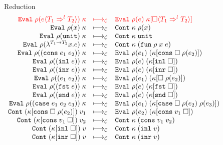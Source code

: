\documentclass[acmsmall,review,anonymous]{acmart}\settopmatter{printfolios=true,printccs=false,printacmref=false}
\newcommand{\sOOinspect}[3]{\mathtt{Eval} \; #2(#1) \; #3}
\newcommand{\sOOreturn}[2]{\mathtt{Cont} \; #2 \; #1}
\newcommand{\eOOvar}[1]{#1}
\newcommand{\eOOsole}[0]{\mathtt{unit}}
\newcommand{\eOOlam}[4]{\lambda^{#1\rightarrow{}#2}#3.#4}
\newcommand{\eOOapp}[2]{#1 \; #2}
\newcommand{\eOOcons}[2]{\mathtt{cons} \; #1 \; #2}
\newcommand{\eOOcar}[1]{\mathtt{fst} \; #1}
\newcommand{\eOOcdr}[1]{\mathtt{snd} \; #1}
\newcommand{\eOOinl}[1]{\mathtt{inl} \; #1}
\newcommand{\eOOinr}[1]{\mathtt{inr} \; #1}
\newcommand{\eOOcase}[3]{\mathtt{case} \; #1 \; #2 \; #3}
\newcommand{\eOOcast}[4]{#1 \langle \cOOcast{#2}{#3}{#4} \rangle}
\newcommand{\cOOcast}[3]{#1 \Rightarrow^{#2} #3}
\newcommand{\vOOfun}[3]{\mathtt{fun} \; #1 \; #2 \; #3}
\newcommand{\vOOtt}[0]{\mathtt{unit}}
\newcommand{\vOOcons}[2]{\mathtt{cons}\;#1\;#2}
\newcommand{\vOOinl}[1]{\mathtt{inl}\;#1}
\newcommand{\vOOinr}[1]{\mathtt{inr}\;#1}
\newcommand{\kOOconsI}[3]{#3[\mathtt{cons} \; \square \; #2(#1) ]}
\newcommand{\kOOconsII}[2]{#2[\mathtt{cons} \; #1 \; \square]}
\newcommand{\kOOinl}[1]{#1[\mathtt{inl} \; \square]}
\newcommand{\kOOinr}[1]{#1[\mathtt{inr} \; \square]}
\newcommand{\kOOappI}[3]{
	#3[\square \; #2(#1) ]
}
\newcommand{\kOOcar}[1]{#1[\mathtt{fst} \; \square]}
\newcommand{\kOOcdr}[1]{#1[\mathtt{snd} \; \square]}
\newcommand{\kOOcaseI}[4]{
	#4[\mathtt{case} \; \square \; #3(#1) \; #3(#2) ]}
\newcommand{\kOOcast}[2]{
	#2[\square \langle #1 \rangle]}
\newcommand{\judgeCreduce}[2]{#1 \longmapsto_{\mathcal{C}} #2}
\newcommand{\redrule}[3]{#1 & \longmapsto_\mathcal{C} & #2 & #3\\}
\newcommand{\hiredrule}[3]{\highlight{#1} & \highlight{\longmapsto_\mathcal{C}} & \highlight{#2} & \highlight{#3} \\}
\newcommand{\highlight}[1]{{\color{red} #1}}
\begin{document}
\begin{figure}
	
	\[
	\begin{array}{rclr}
	\end{array}
	\]
	
	Reduction \fbox{$ \judgeCreduce{s}{s} $}
	\[
	\begin{array}{rclr}
		\hiredrule{
		\sOOinspect{\eOOcast{e}{T_1}{l}{T_2}}{\rho}{\kappa}
	}{
		\sOOinspect{e}{\rho}{
			\kOOcast{\cOOcast{T_1}{l}{T_2}}{\kappa}
		}
	}{}
	\redrule{
		\sOOinspect{\eOOvar{x}}{\rho}{\kappa}
	}{	
		\sOOreturn{\rho(x)}{\kappa}
	}{}
	\redrule{
		\sOOinspect{\eOOsole}{\rho}{\kappa}
	}{
		\sOOreturn{\vOOtt}{\kappa}
	}{}
	\redrule{
		\sOOinspect{\eOOlam{T_1}{T_2}{x}{e}}{\rho}{\kappa}
	}{
		\sOOreturn{(\vOOfun{\rho}{x}{e})}{\kappa}
	}{}
	\redrule{
		\sOOinspect{(\eOOcons{e_1}{e_2})}{\rho}{\kappa}
	}{
		\sOOinspect{e_1}{\rho}{(\kOOconsI{e_2}{\rho}{\kappa})}
	}{}
	\redrule{
		\sOOinspect{(\eOOinl{e})}{\rho}{\kappa}
	}{
		\sOOinspect{e}{\rho}{(\kOOinl{\kappa})}
	}{}
	\redrule{
	\sOOinspect{(\eOOinr{e})}{\rho}{\kappa}
	}{
	\sOOinspect{e}{\rho}{(\kOOinr{\kappa})}
	}{}
	\redrule{
		\sOOinspect{(\eOOapp{e_1}{e_2})}{\rho}{\kappa}
	}{
\sOOinspect{e_1}{\rho}{(\kOOappI{e_2}{\rho}{\kappa})}}{}

\redrule{
\sOOinspect{(\eOOcar{e})}{\rho}{\kappa}}{
\sOOinspect{e}{\rho}{(\kOOcar{\kappa})}}{}

\redrule{
	\sOOinspect{(\eOOcdr{e})}{\rho}{\kappa}}{
	\sOOinspect{e}{\rho}{(\kOOcdr{\kappa})}}{}

\redrule{
\sOOinspect{(\eOOcase{e_1}{e_2}{e_3})}{\rho}{\kappa}}{
\sOOinspect{e_1}{\rho}{(\kOOcaseI{e_2}{e_3}{\rho}{\kappa})}}{}

\redrule{
\sOOreturn{v_1}{(\kOOconsI{e_2}{\rho}{\kappa})}}{
\sOOinspect{e_2}{\rho}{(\kOOconsII{v_1}{\kappa})}}{}

\redrule{
\sOOreturn{v_2}{(\kOOconsII{v_1}{\kappa})}}{
\sOOreturn{(\vOOcons{v_1}{v_2})}{\kappa}}{}

\redrule{
\sOOreturn{v}{(\kOOinl{\kappa})}}{
\sOOreturn{(\vOOinl{v})}{\kappa}}{}

\redrule{
\sOOreturn{v}{(\kOOinr{\kappa})}}{
\sOOreturn{(\vOOinr{v})}{\kappa}}{}


\end{array}\]
\end{figure}
\end{document}

